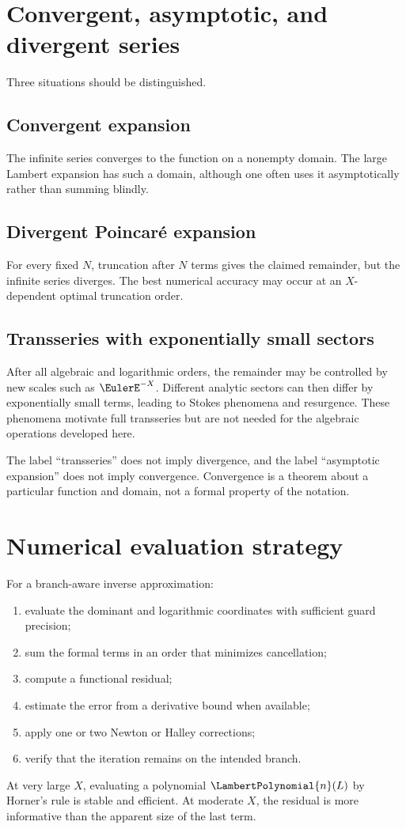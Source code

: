 \documentclass[11pt,openany]{book}
\theoremstyle{definition}
\theoremstyle{plain}
\theoremstyle{remark}
\begin{document}
\section{Convergent, asymptotic, and divergent series}
Three situations should be distinguished.

\subsection{Convergent expansion}
The infinite series converges to the function on a nonempty domain.  The large
Lambert expansion has such a domain, although one often uses it asymptotically
rather than summing blindly.

\subsection{Divergent Poincaré expansion}
For every fixed \(N\), truncation after \(N\) terms gives the claimed remainder,
but the infinite series diverges.  The best numerical accuracy may occur at an
\(X\)-dependent optimal truncation order.

\subsection{Transseries with exponentially small sectors}
After all algebraic and logarithmic orders, the remainder may be controlled by
new scales such as \(\EulerE^{-X}\).  Different analytic sectors can then differ by
exponentially small terms, leading to Stokes phenomena and resurgence.  These
phenomena motivate full transseries but are not needed for the algebraic
operations developed here.

\begin{warningbox}
The label ``transseries'' does not imply divergence, and the label
``asymptotic expansion'' does not imply convergence.  Convergence is a theorem
about a particular function and domain, not a formal property of the notation.
\end{warningbox}

\section{Numerical evaluation strategy}
For a branch-aware inverse approximation:
\begin{enumerate}
\item evaluate the dominant and logarithmic coordinates with sufficient guard
      precision;
\item sum the formal terms in an order that minimizes cancellation;
\item compute a functional residual;
\item estimate the error from a derivative bound when available;
\item apply one or two Newton or Halley corrections;
\item verify that the iteration remains on the intended branch.
\end{enumerate}
At very large \(X\), evaluating a polynomial \(\LambertPolynomial{n}(L)\) by Horner's rule is
stable and efficient.  At moderate \(X\), the residual is more informative than
the apparent size of the last term.
\end{document}

